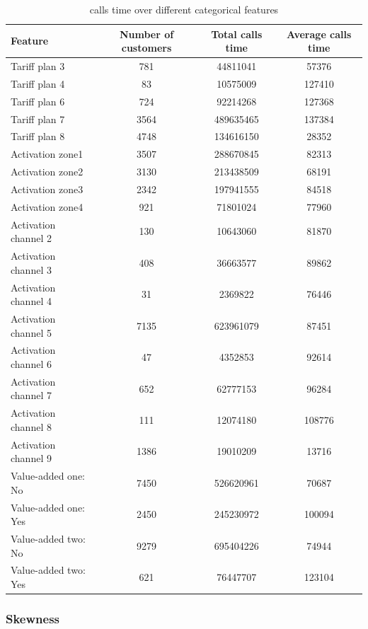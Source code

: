 \begin{table}
  \centering
  \caption{calls time over different categorical features}
  \label{tab:calltime_over_all}
  \begin{tabularx}{.73\textwidth}{lccc}
    \toprule
    Feature & Number of customers & Total calls time & Average calls time \\
    \midrule
    Tariff plan 3 &  781 &  44811041  &  57376 \\
    Tariff plan 4 &   83 &  10575009  & 127410 \\
    Tariff plan 6 &  724 &  92214268  & 127368 \\
    Tariff plan 7 & 3564 & 489635465  & 137384 \\
    Tariff plan 8 & 4748 & 134616150  &  28352 \\
    \midrule
    Activation zone1 & 3507 & 288670845 & 82313 \\
    Activation zone2 & 3130 & 213438509 & 68191 \\
    Activation zone3 & 2342 & 197941555 & 84518 \\
    Activation zone4 &  921 &  71801024 & 77960 \\
    \midrule
    Activation channel 2 &  130 &  10643060 &  81870 \\
    Activation channel 3 &  408 &  36663577 &  89862 \\
    Activation channel 4 &   31 &   2369822 &  76446 \\
    Activation channel 5 & 7135 & 623961079 &  87451 \\
    Activation channel 6 &   47 &   4352853 &  92614 \\
    Activation channel 7 &  652 &  62777153 &  96284 \\
    Activation channel 8 &  111 &  12074180 & 108776 \\
    Activation channel 9 & 1386 &  19010209 &  13716 \\
    \midrule
    Value-added one: No & 7450 & 526620961 &  70687 \\
    Value-added one: Yes & 2450 & 245230972 & 100094 \\
    \midrule
    Value-added two: No & 9279 & 695404226 &  74944 \\
    Value-added two: Yes &  621 &  76447707 & 123104 \\
    \bottomrule
  \end{tabularx}
\end{table}

\subsubsection{Skewness}

